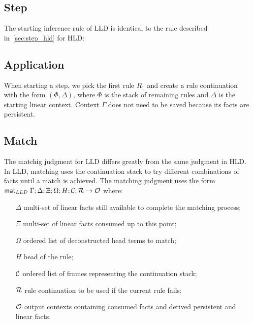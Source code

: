 \subsection{Step}

The starting inference rule of LLD is identical to the rule described
in~\ref{sec:step_hld} for HLD:



\subsection{Application}

When starting a step, we pick the first rule $R_1$ and create a rule
continuation with the form $(\Phi, \Delta)$, where $\Phi$ is the stack of
remaining rules and $\Delta$ is the starting linear context. Context $\Gamma$
does not need to be saved because its facts are persistent.



\subsection{Match}\label{sec:lld_body_match}

The matchig judgment for LLD differs greatly from the same judgment in HLD. In
LLD, matching uses the continuation stack to try different combinations of facts
until a match is achieved. The matching judgment uses the form $\mathsf{mat}_{LLD} \; \Gamma;
\Delta; \Xi; \Omega; H; \mathcal{C}; \mathcal{R} \rightarrow \mathcal{O}$ where:

\begin{enumerate}

   \item[$\Delta$] multi-set of linear facts still available to complete the
   matching process;

   \item[$\Xi$] multi-set of linear facts consumed up to this point;

   \item[$\Omega$] ordered list of deconstructed head terms to match;

   \item[$H$] head of the rule;

   \item[$\mathcal{C}$] ordered list of frames representing the continuation stack;

   \item[$\mathcal{R}$] rule continuation to be used if the current rule fails;

   \item[$\mathcal{O}$] output contexts containing consumed facts and derived
   persistent and linear facts.

\end{enumerate}

